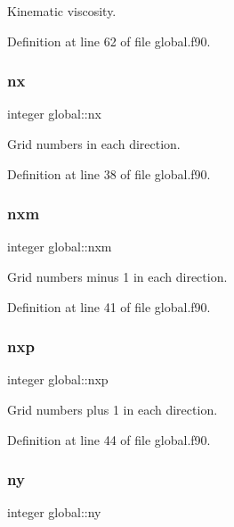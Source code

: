 Kinematic viscosity. 



Definition at line 62 of file global.\+f90.

\mbox{\label{namespaceglobal_a4ba10a6dbbcebb68e0d5e36a6c291898}} 
\subsubsection{\texorpdfstring{nx}{nx}}
{\footnotesize\ttfamily integer global\+::nx}



Grid numbers in each direction. 



Definition at line 38 of file global.\+f90.

\mbox{\label{namespaceglobal_aa37f5fe09139707ac1723302127436b1}} 
\subsubsection{\texorpdfstring{nxm}{nxm}}
{\footnotesize\ttfamily integer global\+::nxm}



Grid numbers minus 1 in each direction. 



Definition at line 41 of file global.\+f90.

\mbox{\label{namespaceglobal_a227001d8177d0295b61a39948436adaa}} 
\subsubsection{\texorpdfstring{nxp}{nxp}}
{\footnotesize\ttfamily integer global\+::nxp}



Grid numbers plus 1 in each direction. 



Definition at line 44 of file global.\+f90.

\mbox{\label{namespaceglobal_a12dd7ca24c7675f31e6de07b1769991c}} 
\subsubsection{\texorpdfstring{ny}{ny}}
{\footnotesize\ttfamily integer global\+::ny}



